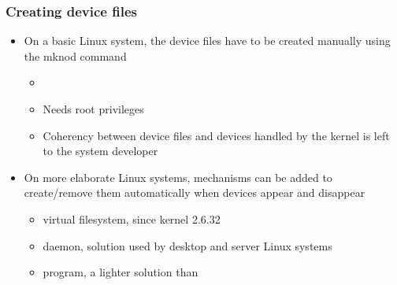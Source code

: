 \begin{frame}
  \frametitle{Creating device files}
  \begin{itemize}
    \item On a basic Linux system, the device files have to be created
    manually using the mknod command
    \begin{itemize}
    \item {}
    \item Needs root privileges
    \item Coherency between device files and devices handled by the
      kernel is left to the system developer
    \end{itemize}
  \item On more elaborate Linux systems, mechanisms can be added to
    create/remove them automatically when devices appear and disappear
    \begin{itemize}
    \item {} virtual filesystem, since kernel 2.6.32
    \item {} daemon, solution used by desktop and server Linux
      systems
    \item {} program, a lighter solution than 
    \end{itemize}
  \end{itemize}
\end{frame}
